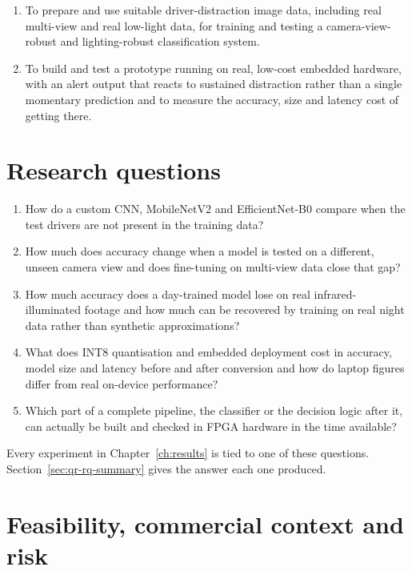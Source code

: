\begin{enumerate}[itemsep=0.15em]
	\item To prepare and use suitable driver-distraction image data, including real multi-view and real low-light data, for training and testing a camera-view-robust and lighting-robust classification system.
	\item To build and test a prototype running on real, low-cost embedded hardware, with an alert output that reacts to sustained distraction rather than a single momentary prediction and to measure the accuracy, size and latency cost of getting there.
\end{enumerate}

\section{Research questions}
\label{sec:research-questions}

\begin{enumerate}[itemsep=0.15em]
	\item[\textbf{RQ1}] How do a custom CNN, MobileNetV2 and EfficientNet-B0 compare when the test drivers are not present in the training data?
	\item[\textbf{RQ2}] How much does accuracy change when a model is tested on a different, unseen camera view and does fine-tuning on multi-view data close that gap?
	\item[\textbf{RQ3}] How much accuracy does a day-trained model lose on real infrared-illuminated footage and how much can be recovered by training on real night data rather than synthetic approximations?
	\item[\textbf{RQ4}] What does INT8 quantisation and embedded deployment cost in accuracy, model size and latency before and after conversion and how do laptop figures differ from real on-device performance?
	\item[\textbf{RQ5}] Which part of a complete pipeline, the classifier or the decision logic after it, can actually be built and checked in FPGA hardware in the time available?
\end{enumerate}

Every experiment in Chapter~\ref{ch:results} is tied to one of these questions. Section~\ref{sec:qr-rq-summary} gives the answer each one produced.

\section{Feasibility, commercial context and risk}

